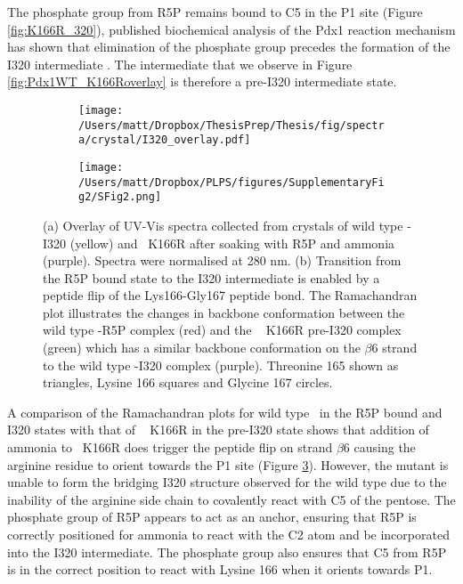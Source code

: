 The phosphate group from R5P remains bound to C5 in the P1 site (Figure \ref{fig:K166R_320}), published biochemical analysis of the Pdx1 reaction mechanism has shown that elimination of the phosphate group precedes the formation of the I320 intermediate \cite{Raschle2007}. The intermediate that we observe in Figure \ref{fig:Pdx1WT_K166Roverlay} is therefore a pre-I320 intermediate state.

\begin{figure}
\centering
\begin{subfigure}{.49\textwidth}
  \centering
  \texttt{[image: /Users/matt/Dropbox/ThesisPrep/Thesis/fig/spectra/crystal/I320\_overlay.pdf]}	
  \caption{}
  \label{fig:K166R_Spec_Xtal}
\end{subfigure}
\begin{subfigure}{.49\textwidth}
  \centering
  \texttt{[image: /Users/matt/Dropbox/PLPS/figures/SupplementaryFig2/SFig2.png]}
  \caption{}
 \label{fig:Ramachandran_beta6} 
\end{subfigure}

\caption[\textit{In crystallo} \atpdx ~K166R spectra and Ramachandran plot]{(a) Overlay of UV-Vis spectra collected from crystals of wild type \atpdx -I320 (yellow) and \atpdx ~K166R after soaking with R5P and ammonia (purple). Spectra were normalised at 280 nm. (b) Transition from the R5P bound state to the I320 intermediate is enabled by a peptide flip of the Lys166-Gly167 peptide bond. The Ramachandran plot illustrates the changes in backbone conformation between the wild type \atpdx -R5P complex (red) and the \atpdx~ K166R pre-I320 complex (green) which has a similar backbone conformation on the $\beta$6 strand to the wild type \atpdx -I320 complex (purple). Threonine 165 shown as triangles, Lysine 166 squares and Glycine 167 circles.}
\end{figure} 

 \par

A comparison of the Ramachandran plots for wild type \atpdx ~in the R5P bound and I320 states with that of \atpdx~ K166R in the pre-I320 state shows that addition of ammonia to \atpdx ~K166R does trigger the peptide flip on strand $\beta$6 causing the arginine residue to orient towards the P1 site (Figure \ref{fig:Ramachandran_beta6}). However, the mutant is unable to form the bridging I320 structure observed for the wild type due to the inability of the arginine side chain to covalently react with C5 of the pentose. The phosphate group of R5P appears to act as an anchor, ensuring that R5P is correctly positioned for ammonia to react with the C2 atom and be incorporated into the I320 intermediate. The phosphate group also ensures that C5 from R5P is in the correct position to react with Lysine 166 when it orients towards P1.
 \par 

